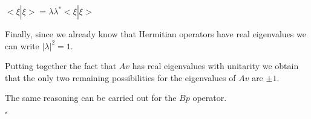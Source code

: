 \documentclass[12pt]{report}
\begin{document}
\begin{minipage}{1\textwidth}
\begin{center}
	    $<\xi|\xi> = \lambda \lambda^* <\xi |\xi>$\newline
	    \end{center}
	    
	    Finally, since we already know that Hermitian operators have real eigenvalues we can write $|\lambda|^2 = 1$.\newline
	    
	    Putting together the fact that $Av$ has real eigenvalues with unitarity we obtain that the only two remaining possibilities for the eigenvalues of $Av$ are $\pm 1$. \newline
	    
	    The same reasoning can be carried out for the $Bp$ operator.
	    
	    \hfill $\square$
	    
	    
	\end{minipage}
	
\end{document}
